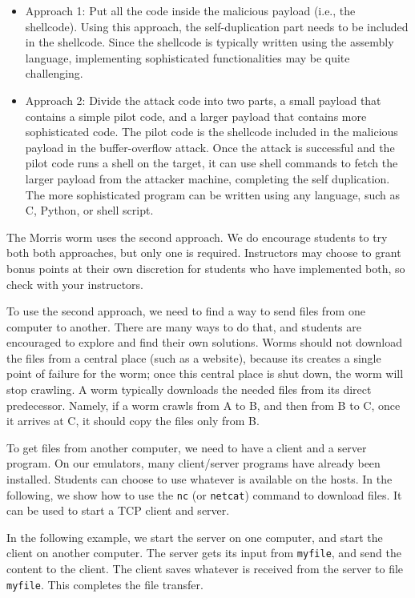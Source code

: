 \begin{itemize}
  \item Approach 1: Put all the code inside the 
    malicious payload (i.e., the shellcode). Using this approach,
    the self-duplication part needs to be included 
    in the shellcode. Since the shellcode is typically written using 
    the assembly language, implementing sophisticated 
    functionalities may be quite challenging.

  \item Approach 2: Divide the attack code into two
    parts, a small payload that contains a simple pilot code, 
    and a larger payload that contains more sophisticated code. 
    The pilot code is the shellcode included in the malicious payload 
    in the buffer-overflow attack. 
    Once the attack is successful and the pilot code runs a shell
    on the target, it can  use shell commands to fetch the larger payload 
    from the attacker machine, completing the self duplication. 
    The more sophisticated program can be written using any language,
    such as C, Python, or shell script. 
\end{itemize}

The Morris worm uses the second approach. We do encourage 
students to try both both approaches, but only one is required. 
Instructors may choose to grant bonus points at their own
discretion for students who have implemented both, 
so check with your instructors.  


To use the second approach, we need to find a way to send
files from one computer to another. There are many ways to do that,
and students are encouraged to explore and find their own solutions.
Worms should not download the files from a central 
place (such as a website), because its creates a single point of failure 
for the worm; once this central place is shut down, the 
worm will stop crawling. A worm typically downloads the needed files from
its direct predecessor. Namely, if a worm crawls from A to B, 
and then from B to C, once it arrives at C, it should
copy the files only from B. 


To get files from another computer, we need to have a client 
and a server program. On our emulators, many client/server programs
have already been installed. Students can choose to use
whatever is available on the hosts. In the following, 
we show how to use the \texttt{nc} (or \texttt{netcat})  
command to download files. 
It can be used to start a TCP client and server. 

In the following example, we start the server on one computer,
and start the client on another computer. The server gets its input
from \texttt{myfile}, and send the content to the client. 
The client saves
whatever is received from the server to file \texttt{myfile}. This completes
the file transfer.


